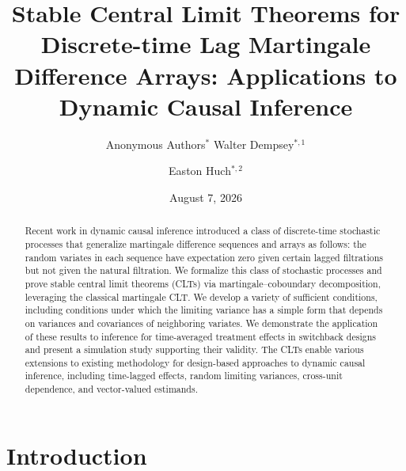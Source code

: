 \documentclass[11pt]{article}
\title{Stable Central Limit Theorems for Discrete-time Lag Martingale Difference Arrays: Applications to Dynamic Causal Inference}
\author{%
  \ifanonymous
    \large Anonymous Authors$^*$
  \else
    \large Walter Dempsey$^{*,1}$ \and
    \large Easton Huch$^{*,2}$
  \fi
}
\date{August 7, 2026}
\newif\ifanonymous
\theoremstyle{definition}
\begin{document}
\maketitle

\let\thefootnote\relax
\ifanonymous
\footnotetext{$^{*}$Author names are removed for anonymous peer review.}
\else
\let\thefootnote\relax
{}
\fi

\begin{abstract}
\normalsize
Recent work in dynamic causal inference introduced a class of discrete-time stochastic processes that generalize martingale difference sequences and arrays as follows: the random variates in each sequence have expectation zero given certain lagged filtrations but not given the natural filtration.
We formalize this class of stochastic processes and prove stable central limit theorems (CLTs) via martingale--coboundary decomposition, leveraging the classical martingale CLT.
We develop a variety of sufficient conditions, including conditions under which the limiting variance has a simple form that depends on variances and covariances of neighboring variates.
We demonstrate the application of these results to inference for time-averaged treatment effects in switchback designs and present a simulation study supporting their validity.
The CLTs enable various extensions to existing methodology for design-based approaches to dynamic causal inference, including time-lagged effects, random limiting variances, cross-unit dependence, and vector-valued estimands.
\end{abstract}

\vfill


\newpage
\section{Introduction}\label{sec:intro}
\end{document}
